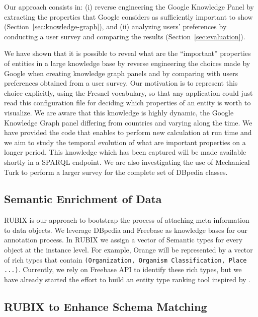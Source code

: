 \documentclass[onecolumn, crcready]{iosart2c}
\begin{document}
Our approach consists in: (i) reverse engineering the Google Knowledge Panel by extracting the properties that Google considers as sufficiently important to show (Section~\ref{sec:knowledge-graph}), and (ii) analyzing users' preferences by conducting a user survey and comparing the results (Section~\ref{sec:evaluation}).

We have shown that it is possible to reveal what are the ``important'' properties of entities in a large knowledge base by reverse engineering the choices made by Google when creating knowledge graph panels and by comparing with users preferences obtained from a user survey. Our motivation is to represent this choice explicitly, using the Fresnel vocabulary, so that any application could just read this configuration file for deciding which properties of an entity is worth to visualize. We are aware that this knowledge is highly dynamic, the Google Knowledge Graph panel differing from countries and varying along the time. We have provided the code that enables to perform new calculation at run time and we aim to study the temporal evolution of what are important properties on a longer period. This knowledge which has been captured will be made available shortly in a SPARQL endpoint. We are also investigating the use of Mechanical Turk to perform a larger survey for the complete set of DBpedia classes.

\subsection{Semantic Enrichment of Data}

RUBIX is our approach to bootstrap the process of attaching meta information to data objects. We leverage DBpedia and Freebase as knowledge bases for our annotation process. In RUBIX we assign a vector of Semantic types for every object at the instance level. For example, Orange will be represented by a vector of rich types that contain \texttt{(Organization, Organism Classification, Place ...)}. Currently, we rely on Freebase API to identify these rich types, but we have already started the effort to build an entity type ranking tool inspired by \cite{TRank}.

\subsection{RUBIX to Enhance Schema Matching}
\end{document}
